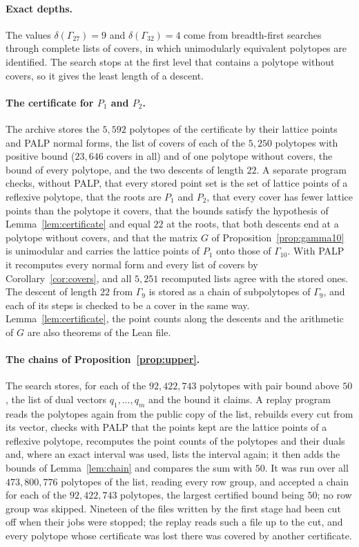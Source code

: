 \documentclass[11pt]{amsart}
\theoremstyle{definition}
\theoremstyle{remark}
\newcommand{\UBs}{50}
\newcommand{\Nabove}{92{,}422{,}743}
\begin{document}
\paragraph*{Exact depths.} The values $\delta(\Gamma_{27})=9$ and
$\delta(\Gamma_{32})=4$ come from breadth-first searches through complete
lists of covers, in which unimodularly equivalent polytopes are identified.
The search stops at the first level that contains a polytope without
covers, so it gives the least length of a descent.

\paragraph*{The certificate for $P_1$ and $P_2$.} The archive stores the
$5{,}592$ polytopes of the certificate by their lattice points and PALP
normal forms, the list of covers of each of the $5{,}250$ polytopes with
positive bound ($23{,}646$ covers in all) and of one polytope without
covers, the bound of every polytope, and
the two descents of length $22$. A separate program checks, without PALP,
that every stored point set is the set of lattice points of a reflexive
polytope, that the roots are $P_1$ and $P_2$, that every cover has fewer
lattice points than the polytope it covers, that the bounds satisfy the
hypothesis of Lemma~\ref{lem:certificate} and equal $22$ at the roots,
that both descents end at a polytope without covers, and that the matrix
$G$ of Proposition~\ref{prop:gamma10} is unimodular and carries the
lattice points of $P_1$ onto those of $\Gamma_{10}$. With PALP it
recomputes every normal form and every list of covers by
Corollary~\ref{cor:covers}, and all $5{,}251$ recomputed lists agree with
the stored ones. The descent of length $22$ from $\Gamma_9$ is
stored as a chain of subpolytopes of $\Gamma_9$, and each of its steps is
checked to be a cover in the same way. Lemma~\ref{lem:certificate}, the
point counts along the descents and the arithmetic of $G$ are also
theorems of the Lean file.

\paragraph*{The chains of Proposition~\ref{prop:upper}.} The search
stores, for each of the $\Nabove$ polytopes with pair bound above $\UBs$,
the list of dual vectors $q_1,\dots,q_m$ and the bound it claims. A replay
program reads the polytopes again from the public copy of the list,
rebuilds every cut from its vector, checks with PALP that the points kept
are the lattice points of a reflexive polytope, recomputes the
point counts of the polytopes and their duals and, where an exact interval
was used, lists the interval again; it then adds the bounds of
Lemma~\ref{lem:chain} and compares the sum with $\UBs$. It was run over
all $473{,}800{,}776$ polytopes of the list, reading every row group, and
accepted a chain for each of the $\Nabove$ polytopes, the largest
certified bound being $\UBs$; no row group was skipped. Nineteen of the
files written by the first stage had been cut off when their jobs were
stopped; the replay reads such a file up to the cut, and every polytope
whose certificate was lost there was covered by another certificate.
\end{document}
